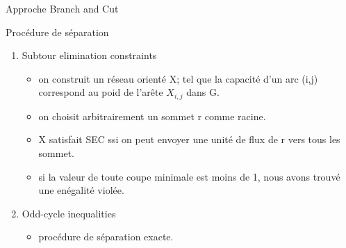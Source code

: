 \begin{frame}{Approche Branch and Cut}
    \begin{block}{Procédure de séparation}
        \begin{enumerate}
            \item Subtour elimination constraints
                \begin{itemize}
                    \item on construit un réseau orienté X; tel que la capacité d'un arc (i,j) correspond au poid de l'arête $X_{i,j}$ dans G.
                    \item on choisit arbitrairement un sommet r comme racine.
                    \item X satisfait SEC ssi on peut envoyer une unité de flux de r vers tous les sommet.
                    \item  si la valeur de toute coupe minimale est moins de 1, nous avons trouvé une enégalité violée.
                \end{itemize}
                
            \item Odd-cycle inequalities 
                \begin{itemize}
                    \item procédure de séparation exacte.
                \end{itemize}
        \end{enumerate}
    \end{block}
\end{frame}